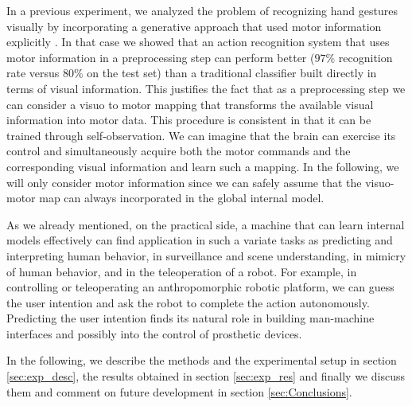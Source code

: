 In a previous experiment, we analyzed the problem of recognizing hand
gestures visually by incorporating a generative approach that used
motor information explicitly \cite{lopes-05,metta-06}. In that case we
showed that an action recognition system that uses motor information
in a preprocessing step can perform better ($97\%$ recognition rate
versus $80\%$ on the test set) than a traditional classifier built
directly in terms of visual information. This justifies the fact that
as a preprocessing step we can consider a visuo to motor mapping that
transforms the available visual information into motor data. This
procedure is consistent in that it can be trained through 
self-observation. We can imagine that the brain can exercise its
control and simultaneously acquire both the motor commands and the
corresponding visual information and learn such a mapping. In the
following, we will only consider motor information since we can safely
assume that the visuo-motor map can always incorporated in the global
internal model.

As we already mentioned, on the practical side, a machine that can
learn internal models effectively can find application in such a
variate tasks as predicting and interpreting human behavior, in
surveillance and scene understanding, in mimicry of human behavior, and in
the teleoperation of a robot. For example, in controlling or teleoperating
an anthropomorphic robotic platform, we can guess the user intention
and ask the robot to complete the action autonomously. Predicting the
user intention finds its natural role in building man-machine interfaces
and possibly into the control of prosthetic devices.

In the following, we describe the methods and the experimental setup
in section \ref{sec:exp_desc}, the results obtained in section
\ref{sec:exp_res} and finally we discuss them and comment on future
development in section \ref{sec:Conclusions}.
